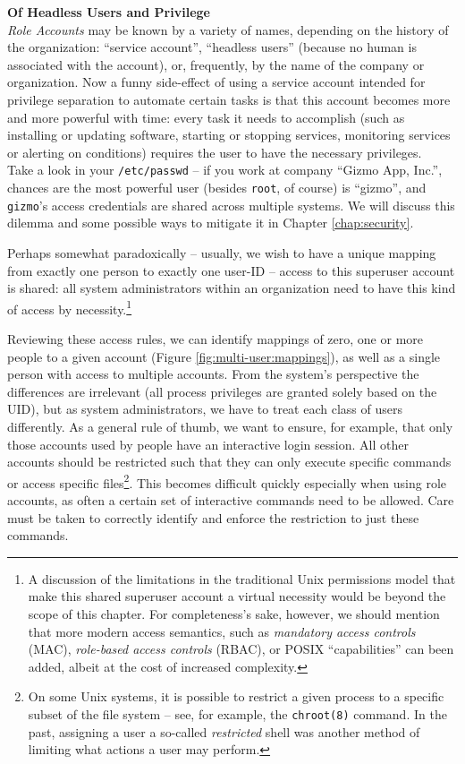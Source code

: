 \begin{sidenote}
{\bf Of Headless Users and Privilege} \\

{\em Role Accounts} may be known by a variety of
names, depending on the history of the organization:
``service account'', ``headless users'' (because no human is
associated with the account), or, frequently, by the
name of the company or organization.  Now a funny
side-effect of using a service account intended for
privilege separation to automate certain tasks is
that this account becomes more and more powerful with
time: every task it needs to accomplish (such as
installing or updating software, starting or stopping
services, monitoring services or alerting on
conditions) requires the user to have the necessary
privileges. \\ [10pt]

Take a look in your {\tt /etc/passwd} -- if you work
at company ``Gizmo App, Inc.'', chances are the most
powerful user (besides {\tt root}, of course) is
``gizmo'', and {\tt gizmo}'s access credentials are
shared across multiple systems.  We will discuss this
dilemma and some possible ways to mitigate it in
Chapter \ref{chap:security}.
\end{sidenote}


Perhaps somewhat paradoxically -- usually, we wish to
have a unique mapping from exactly one person to
exactly one user-ID -- access to this superuser
account is shared: all system administrators within an
organization need to have this kind of access by
necessity.\footnote{A discussion of the limitations in
the traditional Unix permissions model that make this
shared superuser account a virtual necessity would be
beyond the scope of this chapter.  For completeness's
sake, however, we should mention that more modern
access semantics, such as {\em mandatory access
controls} (MAC), {\em role-based access controls}
(RBAC), or POSIX ``capabilities''  can been added,
albeit at the cost of increased complexity.}

Reviewing these access rules, we can identify mappings
of zero, one or more people to a given account (Figure
\ref{fig:multi-user:mappings}), as well as a single
person with access to multiple accounts.  From the
system's perspective the differences are irrelevant
(all process privileges are granted solely based on
the UID), but as system administrators, we have to
treat each class of users differently.  As a general
rule of thumb, we want to ensure, for example, that
only those accounts used by people have an
interactive login session.  All other accounts should
be restricted such that they can only execute specific
commands or access specific files\footnote{On some
Unix systems, it is possible to restrict a given
process to a specific subset of the file system --
see, for example, the {\tt chroot(8)} command.  In the past, assigning a user a
so-called {\em restricted} shell was another method of
limiting what actions a user may perform.}.  This
becomes difficult quickly especially when using role
accounts, as often a certain set of interactive
commands need to be allowed.  Care must be taken to
correctly identify and enforce the restriction to
just these commands.


